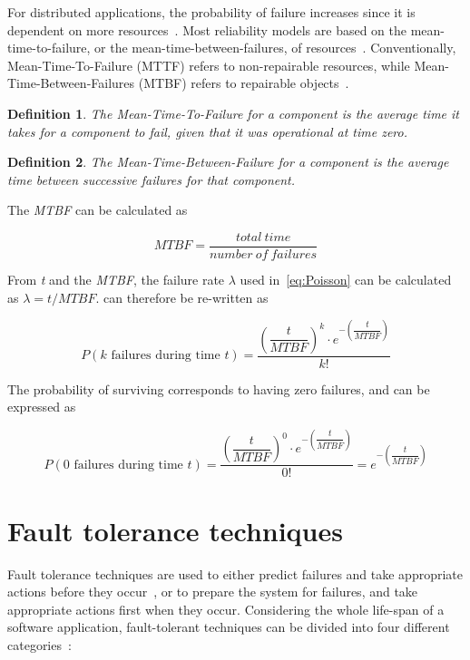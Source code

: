 \documentclass{cslthse-msc}
\newtheorem{definition}{Definition}[chapter]
\begin{document}
For distributed applications, the probability of failure increases since it is dependent on more resources~\cite{relModelDistSimSystem}. Most reliability models are based on the mean-time-to-failure, or the mean-time-between-failures, of resources~\cite{relModelAnalysis}. Conventionally, Mean-Time-To-Failure (MTTF) refers to non-repairable resources, while Mean-Time-Between-Failures (MTBF) refers to repairable objects~\cite{effTaskReplMobGrid}.

\begin{definition} \label{def:mttf}
The Mean-Time-To-Failure for a component is the average time it takes for a component to fail, given that it was operational at time zero.
\end{definition}

\begin{definition} \label{def:MTBF}
The Mean-Time-Between-Failure for a component is the average time between successive failures for that component.
\end{definition}

The \emph{MTBF} can be calculated as

\begin{equation} \label{eq:MTBF}
MTBF = \frac{total\ time}{number\ of\ failures}
\end{equation}

From \emph{t} and the \emph{MTBF}, the failure rate $\lambda$ used in~\cref{eq:Poisson} can be calculated as $\lambda = t/MTBF$.  can therefore be re-written as

\begin{equation} \label{eq:Poisson_during_time_t}
P(k \mbox{ failures during time } t) = \dfrac{\left(\dfrac{t}{MTBF}\right)^k \cdot e^{-\left(\dfrac{t}{MTBF}\right)}}{k!}
\end{equation}

The probability of surviving corresponds to having zero failures, and can be expressed as

\begin{equation} \label{eq:Poisson_no_failures}
P(0 \mbox{ failures during time } t) = \dfrac{\left(\dfrac{t}{MTBF}\right)^0 \cdot e^{-\left(\dfrac{t}{MTBF}\right)}}{0!} = e^{-\left(\dfrac{t}{MTBF}\right)}
\end{equation}

\section{Fault tolerance techniques} \label{sec:background_fault_tol_tech}
Fault tolerance techniques are used to either predict failures and take appropriate actions before they occur~\cite{faultToleranceChallenges}, or to prepare the system for failures, and take appropriate actions first when they occur. Considering the whole life-span of a software application, fault-tolerant techniques can be divided into four different categories~\cite{surveyReliabilityDistr}:
\end{document}
